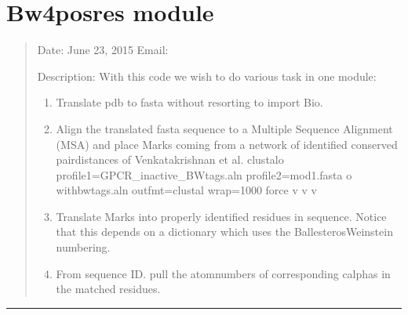 \documentclass[letterpaper,10pt,english]{sphinxmanual}
\begin{document}
\sphinxstepscope


\section{Bw4posres module}
\label{\detokenize{bw4posres:module-bw4posres}}\label{\detokenize{bw4posres:bw4posres-module}}\label{\detokenize{bw4posres::doc}}\begin{quote}

\sphinxAtStartPar
Date:        June 23, 2015
Email:       

\sphinxAtStartPar
Description:
With this code we wish to do various task in one module:
\begin{enumerate}
%
\item {} 
\sphinxAtStartPar
Translate pdb to fasta without resorting to import Bio.

\item {} 
\sphinxAtStartPar
Align the translated fasta sequence to a Multiple Sequence Alignment (MSA)
and place Marks coming from a network of identified conserved
pair\sphinxhyphen{}distances of Venkatakrishnan et al.
clustalo \textendash{}profile1=GPCR\_inactive\_BWtags.aln \textendash{}profile2=mod1.fasta     \sphinxhyphen{}o withbwtags.aln \textendash{}outfmt=clustal \textendash{}wrap=1000 \textendash{}force \sphinxhyphen{}v \sphinxhyphen{}v \sphinxhyphen{}v

\item {} 
\sphinxAtStartPar
Translate Marks into properly identified residues in sequence. Notice that
this depends on a dictionary which uses the Ballesteros\sphinxhyphen{}Weinstein numbering.

\item {} 
\sphinxAtStartPar
From sequence ID. pull the atom\sphinxhyphen{}numbers of corresponding c\sphinxhyphen{}alphas
in the matched residues.

\end{enumerate}
\end{quote}


\bigskip\hrule\bigskip

\end{document}
